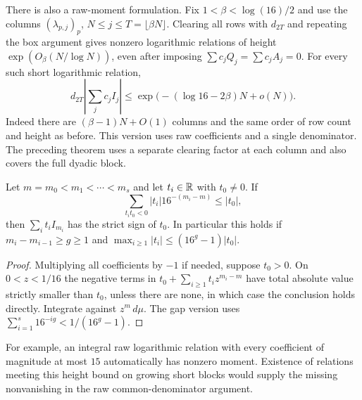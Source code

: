 \documentclass[11pt,a4paper]{article}
\theoremstyle{definition}\newtheorem{definition}[theorem]{Definition}\newtheorem{example}[theorem]{Example}
\theoremstyle{remark}\newtheorem{remark}[theorem]{Remark}
\begin{document}
There is also a raw-moment formulation. Fix $1<\beta<\log(16)/2$ and use
the columns $(\lambda_{p,j})_p$, $N\le j\le T=\lfloor\beta N\rfloor$.
Clearing all rows with $d_{2T}$ and repeating the box argument gives
nonzero logarithmic relations of height $\exp(O_\beta(N/\log N))$,
even after imposing $\sum c_jQ_j=\sum c_jA_j=0$.
For every such short logarithmic relation,
\[
 d_{2T}\left|\sum_j c_j I_j\right|
 \le\exp\bigl(- (\log16-2\beta)N+o(N)\bigr).
\]
Indeed there are $(\beta-1)N+O(1)$ columns and the same order of row
count and height as before. This version uses raw coefficients and a single
denominator. The preceding theorem uses a separate clearing factor at
each column and also covers the full dyadic block.

\begin{proposition}\label{prop:ku-dominance}
Let $m=m_0<m_1<\cdots<m_s$ and let $t_i\in\mathbb R$ with $t_0\ne0$.
If
\[
 \sum_{t_it_0<0}|t_i|16^{-(m_i-m)}\le |t_0|,
\]
then $\sum_i t_iI_{m_i}$ has the strict sign of $t_0$. In particular
this holds if $m_i-m_{i-1}\ge g\ge1$ and
$\max_{i\ge1}|t_i|\le(16^g-1)|t_0|$.
\end{proposition}
\begin{proof}
Multiplying all coefficients by $-1$ if needed, suppose $t_0>0$.
On $0<z<1/16$ the negative terms in
$t_0+\sum_{i\ge1}t_i z^{m_i-m}$ have total absolute value strictly
smaller than $t_0$, unless there are none, in which case the conclusion
holds directly. Integrate against $z^m\,d\mu$. The gap version uses
$\sum_{i=1}^s16^{-ig}<1/(16^g-1)$.
\end{proof}
For example, an integral raw logarithmic relation with every coefficient
of magnitude at most $15$ automatically has nonzero moment. Existence
of relations meeting this height bound on growing short blocks would
supply the missing nonvanishing in the raw common-denominator argument.
\end{document}
